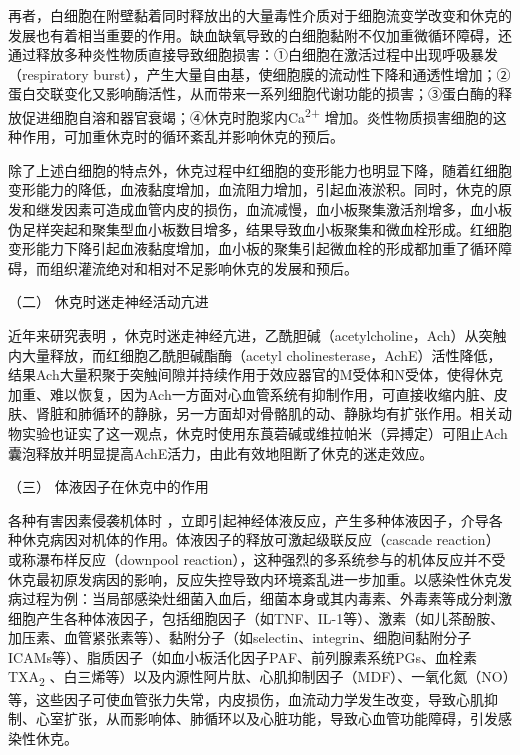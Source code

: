 再者，白细胞在附壁黏着同时释放出的大量毒性介质对于细胞流变学改变和休克的发展也有着相当重要的作用。缺血缺氧导致的白细胞黏附不仅加重微循环障碍，还通过释放多种炎性物质直接导致细胞损害：①白细胞在激活过程中出现呼吸暴发（respiratory
burst），产生大量自由基，使细胞膜的流动性下降和通透性增加；②蛋白交联变化又影响酶活性，从而带来一系列细胞代谢功能的损害；③蛋白酶的释放促进细胞自溶和器官衰竭；④休克时胞浆内Ca\textsuperscript{2+}
增加。炎性物质损害细胞的这种作用，可加重休克时的循环紊乱并影响休克的预后。

除了上述白细胞的特点外，休克过程中红细胞的变形能力也明显下降，随着红细胞变形能力的降低，血液黏度增加，血流阻力增加，引起血液淤积。同时，休克的原发和继发因素可造成血管内皮的损伤，血流减慢，血小板聚集激活剂增多，血小板伪足样突起和聚集型血小板数目增多，结果导致血小板聚集和微血栓形成。红细胞变形能力下降引起血液黏度增加，血小板的聚集引起微血栓的形成都加重了循环障碍，而组织灌流绝对和相对不足影响休克的发展和预后。

\hypertarget{text00055.htmlux5cux23CHP2-1-1-2-2}{}
（二） 休克时迷走神经活动亢进

近年来研究表明
，休克时迷走神经亢进，乙酰胆碱（acetylcholine，Ach）从突触内大量释放，而红细胞乙酰胆碱酯酶（acetyl
cholinesterase，AchE）活性降低，结果Ach大量积聚于突触间隙并持续作用于效应器官的M受体和N受体，使得休克加重、难以恢复，因为Ach一方面对心血管系统有抑制作用，可直接收缩内脏、皮肤、肾脏和肺循环的静脉，另一方面却对骨骼肌的动、静脉均有扩张作用。相关动物实验也证实了这一观点，休克时使用东莨菪碱或维拉帕米（异搏定）可阻止Ach囊泡释放并明显提高AchE活力，由此有效地阻断了休克的迷走效应。

\hypertarget{text00055.htmlux5cux23CHP2-1-1-2-3}{}
（三） 体液因子在休克中的作用

各种有害因素侵袭机体时
，立即引起神经体液反应，产生多种体液因子，介导各种休克病因对机体的作用。体液因子的释放可激起级联反应（cascade
reaction）或称瀑布样反应（downpool
reaction），这种强烈的多系统参与的机体反应并不受休克最初原发病因的影响，反应失控导致内环境紊乱进一步加重。以感染性休克发病过程为例：当局部感染灶细菌入血后，细菌本身或其内毒素、外毒素等成分刺激细胞产生各种体液因子，包括细胞因子（如TNF、IL-1等）、激素（如儿茶酚胺、加压素、血管紧张素等）、黏附分子（如selectin、integrin、细胞间黏附分子ICAMs等）、脂质因子（如血小板活化因子PAF、前列腺素系统PGs、血栓素TXA\textsubscript{2}
、白三烯等）以及内源性阿片肽、心肌抑制因子（MDF）、一氧化氮（NO）等，这些因子可使血管张力失常，内皮损伤，血流动力学发生改变，导致心肌抑制、心室扩张，从而影响体、肺循环以及心脏功能，导致心血管功能障碍，引发感染性休克。

